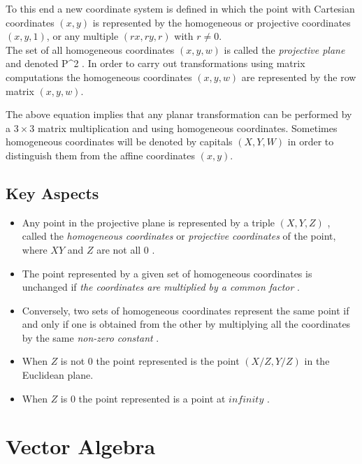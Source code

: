 \documentclass[12pt]{report}
\begin{document}
To this end a new coordinate system is defined in which the point with Cartesian coordinates $(x , y)$ is represented by the homogeneous or projective coordinates $( x , y , 1 )$, or any multiple $( rx , ry , r )$ with $ r \neq 0 $.
\\
\vspace{.5cm}
The set of all homogeneous coordinates $(x , y , w)$ is called the \textit{projective plane} and denoted P^2 . In order to carry out transformations using matrix computations the homogeneous coordinates $( x, y, w )$ are represented by the row matrix $(x, y, w)$. 
\\
\vspace{.5cm}

\hspace{1cm} The above equation implies that any planar transformation can be performed by a $ 3 × 3 $ matrix multiplication and using homogeneous coordinates. Sometimes homogeneous coordinates will be denoted by capitals $ (X, Y, W) $  in order to distinguish them from the affine coordinates $(x, y)$.


\subsection{Key Aspects}
\begin{itemize}
  \item 
  Any point in the projective plane is represented by a triple $ (X, Y, Z) $ , called the \textit{ homogeneous coordinates }  or \textit{ projective coordinates } of the point, where $ X Y$  and $ Z$  are not all $ 0$ .
  \item 
  The point represented by a given set of homogeneous coordinates is unchanged if \textit{  the coordinates are multiplied by a common factor }.
  \item 
  Conversely, two sets of homogeneous coordinates represent the same point if and only if one is obtained from the other by multiplying all the coordinates by the same  \textit{ non-zero constant }.
  \item 
  When $ Z $  is not $ 0$  the point represented is the point $ (X/Z, Y/Z)$  in the Euclidean plane.
  \item 
  When $ Z $  is $ 0$  the point represented is a point at $ infinity $ .
\end{itemize}

\section{Vector Algebra}
\end{document}
